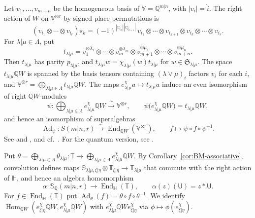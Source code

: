 \documentclass[11pt,a4paper]{amsart}
\theoremstyle{definition}
\theoremstyle{remark}
\newcommand{\Q}{\mathbb Q}
\newcommand{\bS}{\mathbb S}
\newcommand{\bH}{\mathbb H}
\newcommand{\bT}{\mathbb T}
\newcommand{\End}{\operatorname{End}}
\newcommand{\Hom}{\operatorname{Hom}}
\newcommand{\Ad}{\operatorname{Ad}}
\newcommand{\lm}{\lambda|\mu}
\newcommand{\xh}{\xi|\eta}
\numberwithin{equation}{section}
\begin{document}
Let $v_1,\dots,v_{m+n}$ be the homogeneous basis of
$\mathbb V=\Q^{m|n}$, with $|v_i|=\widehat i$. The right action of $W$ on
$\mathbb V^{\otimes r}$ by signed place permutations is
$$
(v_{i_1}\otimes\cdots\otimes v_{i_r})s_k
=(-1)^{|v_{i_k}||v_{i_{k+1}}|}\,
v_{i_1}\otimes\cdots\otimes v_{i_{k+1}}\otimes v_{i_k}
\otimes\cdots\otimes v_{i_r}.
$$
For $\lm\in\Lambda$, put
$$
t_{\lm}=v_1^{\otimes\lambda_1}\otimes\cdots\otimes v_m^{\otimes\lambda_m}
\otimes v_{m+1}^{\otimes\mu_1}\otimes\cdots\otimes v_{m+n}^{\otimes\mu_n}.
$$
Then $t_{\lm}$ has parity $p_{\lm}$, and $t_{\lm}w=\chi_{\lm}(w)t_{\lm}$ for
$w\in\mathfrak S_{\lm}$. The space $t_{\lm}\Q W$ is spanned by the basis
tensors containing $(\lambda\vee\mu)_i$ factors $v_i$ for each $i$, and
$\mathbb V^{\otimes r}=\bigoplus_{\lm\in\Lambda}t_{\lm}\Q W$. The maps
$e_{\lm}^\chi a\mapsto t_{\lm}a$ induce an even isomorphism of right
$\Q W$-modules
$$
\psi:\bigoplus_{\lm\in\Lambda}e_{\lm}^\chi\Q W\xrightarrow{\ \sim\ }
\mathbb V^{\otimes r},
\qquad \psi\bigl(e_{\lm}^\chi\Q W\bigr)=t_{\lm}\Q W,
$$
and hence an isomorphism of superalgebras
\begin{equation}\label{eq:Ad-psi}
\Ad_\psi:S(m|n,r)\xrightarrow{\ \sim\ }\End_{\Q W}(\mathbb V^{\otimes r}),
\qquad f\longmapsto\psi\circ f\circ\psi^{-1}.
\end{equation}
See \cite{Don} and \cite[Section~3.1]{HKN}, and cf.\ \cite[Theorem~5.2]{BK}.
For the quantum version, see \cite{DuRui}.



Put $\theta=\bigoplus_{\lm\in\Lambda}\theta_{\lm}:\bT\to
\bigoplus_{\lm\in\Lambda}e^\chi_{\lm}\Q W$. By
Corollary~\ref{cor:BM-associative}, convolution defines maps
$\bS_{\lm,\xh}\otimes\bT_{\xh}\to\bT_{\lm}$ that commute with the right
action of $\bH$, and hence an algebra homomorphism
$$
\alpha:\bS_\Q(m|n,r)\longrightarrow\End_{\bH}(\bT),\qquad \alpha(z)(\mathsf U)=z*\mathsf U .
$$
For $f\in\End_{\bH}(\bT)$ put $\Ad_\theta(f)=\theta\circ f\circ\theta^{-1}$. We
identify $\Hom_{\Q W}(e_{\xh}^\chi\Q W,e_{\lm}^\chi\Q W)$ with
$e_{\lm}^\chi\Q We_{\xh}^\chi$ via $\phi\mapsto\phi(e_{\xh}^\chi)$.
\end{document}
